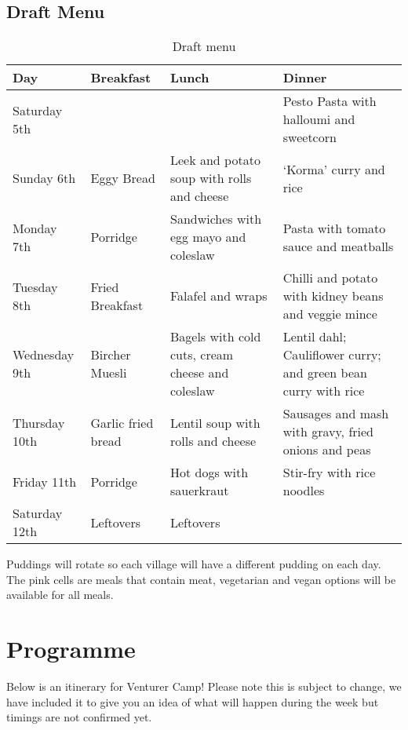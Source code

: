 \documentclass[a4paper, 11pt]{report}
\newcommand{\nl}{\newline}
\begin{document}
\section{Draft Menu}
\begin{table}[H]
    \centering
    {\RaggedRight
    \begin{tabular}{p{} p{} p{} p{}}
        \textbf{Day} & \textbf{Breakfast} & \textbf{Lunch} & \textbf{Dinner}\\
        \hline
        Saturday 5th & \cellcolor{gray!25} & \cellcolor{gray!25} & Pesto Pasta with halloumi and sweetcorn\\
        \hline
        Sunday 6th & Eggy Bread & Leek and potato soup with rolls and cheese & `Korma' curry and rice \\
        \hline
        Monday 7th & Porridge & Sandwiches with egg mayo and coleslaw & \cellcolor{red!25} Pasta with tomato sauce and meatballs\\
        \hline
        Tuesday 8th & Fried Breakfast & Falafel and wraps & Chilli and potato with kidney beans and veggie mince \\
        \hline
        Wednesday 9th & Bircher Muesli & \cellcolor{red!25} Bagels with cold cuts, cream cheese and coleslaw & Lentil dahl; Cauliflower curry; and green bean curry with rice\\
        \hline
        Thursday 10th & Garlic fried bread & Lentil soup with rolls and cheese & \cellcolor{red!25} Sausages and mash with gravy, fried onions and peas\\
        \hline
        Friday 11th & Porridge & \cellcolor{red!25} Hot dogs with sauerkraut & Stir-fry with rice noodles\\
        \hline
        Saturday 12th & Leftovers & Leftovers & \cellcolor{gray!25}\\
        \hline
    \end{tabular}
    }%
    \caption{Draft menu}
\end{table}
Puddings will rotate so each village will have a different pudding on each day.
The pink cells are meals that contain meat, vegetarian and vegan options will be available for all meals.

\chapter{Programme}
Below is an itinerary for Venturer Camp! Please note this is subject to change, we have included it to give you an idea of what will happen during the week but timings are not confirmed yet. \nl
\end{document}
